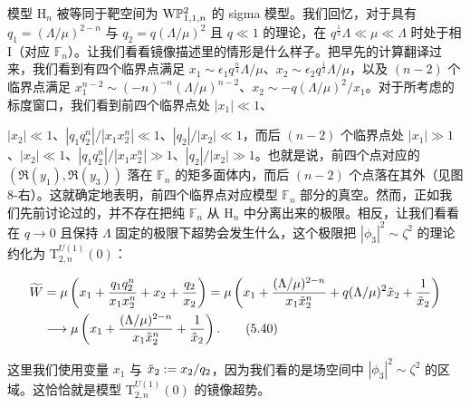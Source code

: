 

模型 $\mathrm{H}_n$ 被等同于靶空间为 $\mathrm{W}\mathbb{P}^2_{1,1,n}$ 的 sigma 模型。我们回忆，对于具有 $q_1=(\Lambda/\mu)^{2-n}$ 与 $q_2=q(\Lambda/\mu)^2$ 且 $q\ll1$ 的理论，在 $q^{\frac12}\Lambda\ll\mu\ll\Lambda$ 时处于相 I（对应 $\mathbb{F}_n$）。让我们看看镜像描述里的情形是什么样子。把早先的计算翻译过来，我们看到有四个临界点满足 $x_1\sim\epsilon_1q^{\frac{n}{4}}\Lambda/\mu$、$x_2\sim\epsilon_2q^{\frac12}\Lambda/\mu$，以及 $(n-2)$ 个临界点满足 $x_1^{n-2}\sim(-n)^{-n}(\Lambda/\mu)^{n-2}$、$x_2\sim-q(\Lambda/\mu)^2/x_1$。对于所考虑的标度窗口，我们看到前四个临界点处 $|x_1|\ll1$、


$|x_2|\ll1$、$|q_1q_2^n|/|x_1x_2^n|\ll1$、$|q_2|/|x_2|\ll1$，而后 $(n-2)$ 个临界点处 $|x_1|\gg1$、$|x_2|\ll1$、$|q_1q_2^n|/|x_1x_2^n|\gg1$、$|q_2|/|x_2|\gg1$。也就是说，前四个点对应的 $(\Re(y_1),\Re(y_3))$ 落在 $\mathbb{F}_n$ 的矩多面体内，而后 $(n-2)$ 个点落在其外（见图 8-右）。这就确定地表明，前四个临界点对应模型 $\mathbb{F}_n$ 部分的真空。然而，正如我们先前讨论过的，并不存在把纯 $\mathbb{F}_n$ 从 $\mathrm{H}_n$ 中分离出来的极限。相反，让我们看看在 $q\to0$ 且保持 $\Lambda$ 固定的极限下超势会发生什么，这个极限把 $|\phi_3|^2\sim\zeta^2$ 的理论约化为 $\mathrm{T}^{U(1)}_{2,n}(0)$：

\begin{align}
	\widetilde{W} &= \mu\left(x_1+\frac{q_1q_2^n}{x_1x_2^n}+x_2+\frac{q_2}{x_2}\right)
	= \mu\left(x_1+\frac{(\Lambda/\mu)^{2-n}}{x_1\tilde x_2^n}+q(\Lambda/\mu)^2\tilde x_2+\frac{1}{\tilde x_2}\right)\nonumber\\
	&\longrightarrow \mu\left(x_1+\frac{(\Lambda/\mu)^{2-n}}{x_1\tilde x_2^n}+\frac{1}{\tilde x_2}\right). \tag{5.40}
\end{align}

这里我们使用变量 $x_1$ 与 $\tilde x_2:=x_2/q_2$，因为我们看的是场空间中 $|\phi_3|^2\sim\zeta^2$ 的区域。这恰恰就是模型 $\mathrm{T}^{U(1)}_{2,n}(0)$ 的镜像超势。

